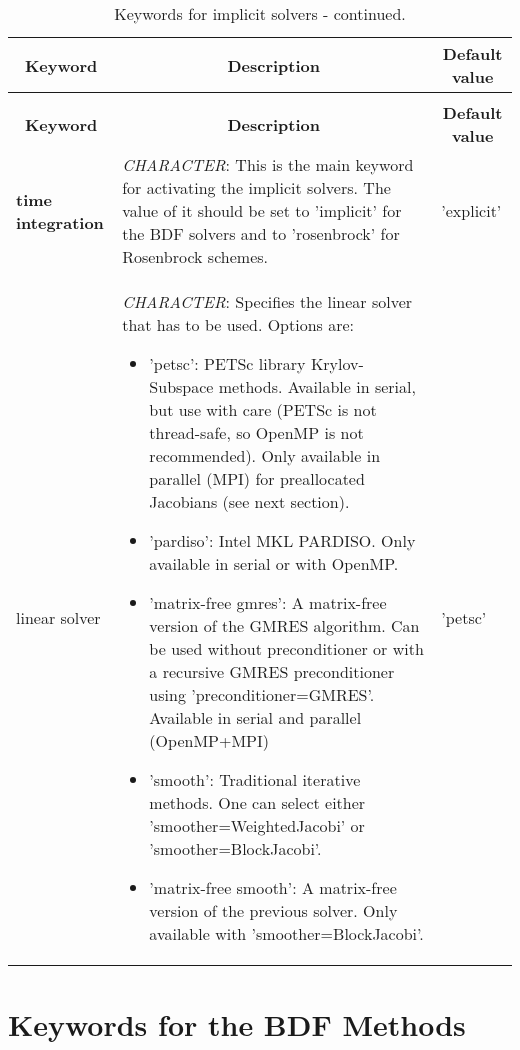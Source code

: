\documentclass[a4paper,10pt]{report}
\begin{document}
\begin{longtable}{|p{4cm}|p{10cm}|p{2.2cm}|}
\caption{Keywords for implicit solvers.} \label{tab:implicitkey} \\
\hline
\multicolumn{1}{|c|}{\textbf{Keyword}} & \multicolumn{1}{c|}{\textbf{Description}} & \multicolumn{1}{c|}{\textbf{Default value}} \\ \hline
\endfirsthead

\caption{Keywords for implicit solvers - continued.} \\
\hline
\multicolumn{1}{|c|}{\textbf{Keyword}} & \multicolumn{1}{c|}{\textbf{Description}} & \multicolumn{1}{c|}{\textbf{Default value}} \\ \hline
\endhead

\textbf{time integration} & \textit{CHARACTER}: This is the main keyword for activating the implicit solvers. The value of it should be set to 'implicit' for the BDF solvers and to 'rosenbrock' for Rosenbrock schemes. & 'explicit' \\ \hline

linear solver           & \textit{CHARACTER}: Specifies the linear solver that has to be used. Options are:\
				\begin{itemize}
					\item 'petsc': PETSc library Krylov-Subspace methods. Available in serial, but use with care (PETSc is not thread-safe, so OpenMP is not recommended). Only available in parallel (MPI) for preallocated Jacobians (see next section).
					\item 'pardiso': Intel MKL PARDISO. Only available in serial or with OpenMP.
					\item 'matrix-free gmres': A matrix-free version of the GMRES algorithm. Can be used without preconditioner or with a recursive GMRES preconditioner using 'preconditioner=GMRES'. Available in serial and parallel (OpenMP+MPI)
					\item 'smooth': Traditional iterative methods. One can select either 'smoother=WeightedJacobi' or 'smoother=BlockJacobi'.
					\item 'matrix-free smooth': A matrix-free version of the previous solver. Only available with 'smoother=BlockJacobi'.
				\end{itemize}
										& 'petsc'  \\ \hline



\end{longtable}

\section{Keywords for the BDF Methods}
\end{document}
